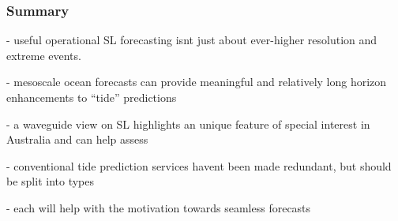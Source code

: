 \begin{frame}
\frametitle{Summary}

- useful operational SL forecasting isnt just about ever-higher resolution and extreme events.

- mesoscale ocean forecasts can provide meaningful and relatively long horizon enhancements to ``tide'' predictions 

- a waveguide view on SL  highlights an unique feature of special interest in Australia and can help assess 

- conventional tide prediction services havent been made redundant, but should be split into types 

- each will help with the motivation towards seamless forecasts 


\end{frame}